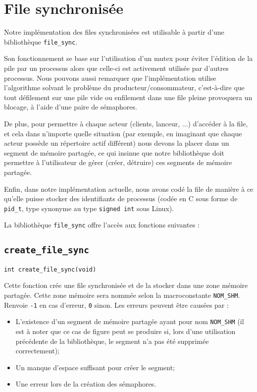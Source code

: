 \documentclass[12pt]{article}
\begin{document}
\section{File synchronisée}
Notre implémentation des files synchronisées est utilisable à partir d'une
bibliothèque \texttt{file\_sync}.

Son fonctionnement se base sur l'utilisation d'un mutex pour éviter
l'édition de la pile par un processus alors que celle-ci est activement
utilisée par d'autres processus. Nous pouvons aussi remarquer que
l'implémentation utilise l'algorithme solvant le problème du
producteur/consommateur, c'est-à-dire que tout défilement sur une pile vide ou
enfilement dans une file pleine provoquera un blocage, à l'aide d'une paire de
sémaphores.

De plus, pour permettre à chaque acteur (clients, lanceur, ...) d'accéder à
la file, et cela dans n'importe quelle situation (par exemple, en imaginant que
chaque acteur possède un répertoire actif différent) nous devons la placer dans
un segment de mémoire partagée, ce qui insinue que notre bibliothèque doit
permettre à l'utilisateur de gérer (créer, détruire) ces segments de mémoire
partagée.

Enfin, dans notre implémentation actuelle, nous avons codé la file de
manière à ce qu'elle puisse stocker des identifiants de processus (codée en C
sous forme de \texttt{pid\_t}, type synonyme au type \texttt{signed int} sous
Linux).

La bibliothèque \texttt{file\_sync} offre l'accès aux fonctions suivantes :

\subsection{\texttt{create\_file\_sync}}

\begin{center}
    \texttt{int create\_file\_sync(void)}
\end{center}

Cette fonction crée une file synchronisée et de la stocker dans une zone
mémoire partagée. Cette zone mémoire sera nommée selon la macroconstante
\texttt{NOM\_SHM}.
Renvoie \texttt{-1} en cas d'erreur, \texttt{0} sinon. Les erreurs peuvent
être causées par :
\begin{itemize}
    \item L'existence d'un segment de mémoire partagée ayant pour nom
          \texttt{NOM\_SHM} (il est à noter que ce cas de figure peut se produire si,
          lors d'une utilisation précédente de la bibliothèque, le segment n'a pas été
          supprimée correctement);
    \item Un manque d'espace suffisant pour créer le segment;
    \item Une erreur lors de la création des sémaphores.
\end{itemize}
\end{document}
